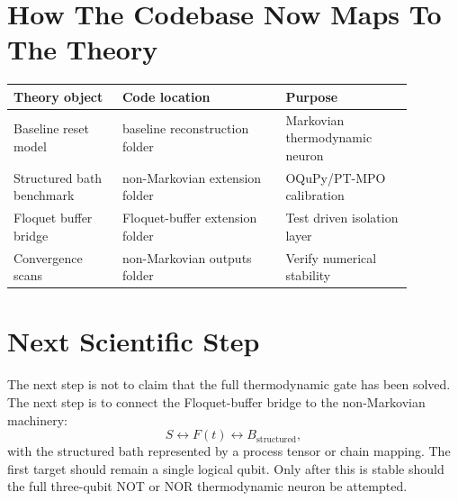 \documentclass[11pt]{article}
\begin{document}
\section{How The Codebase Now Maps To The Theory}

\begin{center}
\begin{tabular}{>{\raggedright\arraybackslash}p{0.24\linewidth}
                >{\raggedright\arraybackslash}p{0.36\linewidth}
                >{\raggedright\arraybackslash}p{0.28\linewidth}}
\hline
Theory object & Code location & Purpose \\
\hline
Baseline reset model
& baseline reconstruction folder
& Markovian thermodynamic neuron \\
Structured bath benchmark
& non-Markovian extension folder
& OQuPy/PT-MPO calibration \\
Floquet buffer bridge
& Floquet-buffer extension folder
& Test driven isolation layer \\
Convergence scans
& non-Markovian outputs folder
& Verify numerical stability \\
\hline
\end{tabular}
\end{center}

\section{Next Scientific Step}

The next step is not to claim that the full thermodynamic gate has been solved.  The next step is
to connect the Floquet-buffer bridge to the non-Markovian machinery:
\begin{equation}
    S \longleftrightarrow F(t) \longleftrightarrow B_{\mathrm{structured}},
\end{equation}
with the structured bath represented by a process tensor or chain mapping.  The first target
should remain a single logical qubit.  Only after this is stable should the full three-qubit NOT
or NOR thermodynamic neuron be attempted.
\end{document}
